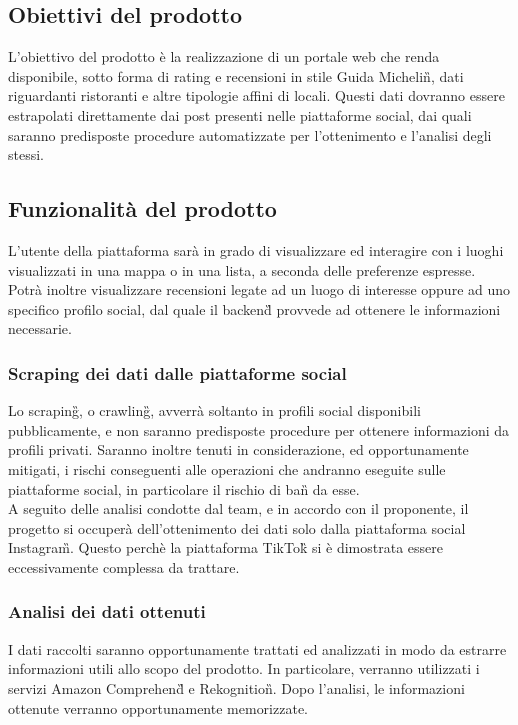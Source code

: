 \subsection{Obiettivi del prodotto}
L'obiettivo del prodotto è la realizzazione di un portale web che renda disponibile, sotto forma di rating e recensioni in stile Guida Michelin\G{}, dati riguardanti 
ristoranti e altre tipologie affini di locali. 
Questi dati dovranno essere estrapolati direttamente dai post presenti nelle piattaforme social, dai quali saranno predisposte procedure automatizzate per l'ottenimento e l'analisi degli stessi.

\subsection{Funzionalità del prodotto}
L'utente della piattaforma sarà in grado di visualizzare ed interagire con i luoghi visualizzati in una mappa o in una lista, a seconda delle preferenze espresse.
Potrà inoltre visualizzare recensioni legate ad un luogo di interesse oppure ad uno specifico profilo social, dal quale il backend\G{} provvede ad ottenere le informazioni necessarie.

\subsubsection{Scraping dei dati dalle piattaforme social}
Lo scraping\G{}, o crawling\G{}, avverrà soltanto in profili social disponibili pubblicamente, e non saranno predisposte procedure per ottenere informazioni da profili privati.
Saranno inoltre tenuti in considerazione, ed opportunamente mitigati, i rischi conseguenti alle operazioni che andranno eseguite sulle piattaforme social, in particolare il rischio di ban\G{} da esse.\\
A seguito delle analisi condotte dal team, e in accordo con il proponente, il progetto si occuperà dell'ottenimento dei dati solo dalla piattaforma social Instagram\G{}. Questo perchè la piattaforma TikTok\G{} si è dimostrata essere eccessivamente complessa da trattare.

\subsubsection{Analisi dei dati ottenuti}
I dati raccolti saranno opportunamente trattati ed analizzati in modo da estrarre informazioni utili allo scopo del prodotto. 
In particolare, verranno utilizzati i servizi Amazon Comprehend\G{} e Rekognition\G{}.
Dopo l'analisi, le informazioni ottenute verranno opportunamente memorizzate.

